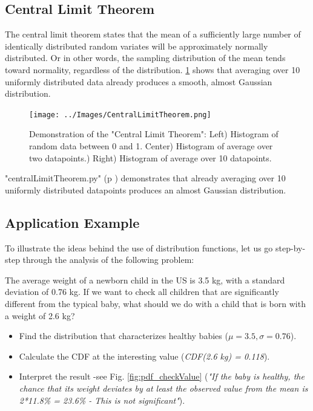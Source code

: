\subsection{Central Limit Theorem}\label{sec:CentralLimitTheorem}
The central limit theorem states that the mean of a sufficiently large number of identically distributed random variates will be approximately normally distributed. Or in other words, the sampling distribution of the mean tends toward normality, regardless of the distribution.
\ref{fig:CentralLimitTheorem} shows that averaging over 10 uniformly distributed data already produces a smooth, almost Gaussian distribution.

\begin{figure}
  \centering
  \texttt{[image: ../Images/CentralLimitTheorem.png]}\\
  \caption{Demonstration of the "Central Limit Theorem": Left) Histogram of random data between 0 and 1. Center) Histogram of average over two datapoints.) Right) Histogram of average over 10 datapoints.}\label{fig:CentralLimitTheorem}
\end{figure}

\PyImg "centralLimitTheorem.py" (p \pageref{py:centralLimitTheorem}) demonstrates that already averaging over 10 uniformly distributed datapoints produces an almost Gaussian distribution.

\subsection{Application Example}

To illustrate the ideas behind the use of distribution functions, let us go step-by-step through the analysis of the following problem:

The average weight of a newborn child in the US is 3.5 kg, with a standard deviation of 0.76 kg. If we want to check all children that are significantly different from the typical baby, what should we do with a child that is born with a weight of 2.6 kg?

\begin{itemize}
  \item Find the distribution that characterizes healthy babies ($\mu=3.5, \sigma=0.76$).
  \item Calculate the CDF at the interesting value (\emph{CDF(2.6 kg) = 0.118}).
  \item Interpret the result -see Fig. \ref{fig:pdf_checkValue} (\emph{"If the baby is healthy, the chance that its weight deviates by at least the observed value from the mean is 2*11.8\% = 23.6\% - This is not significant"}).
\end{itemize}

